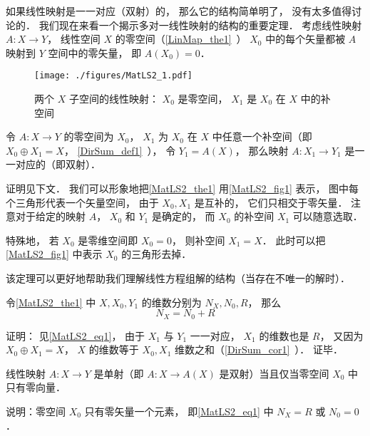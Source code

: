

如果线性映射是一一对应（双射）的， 那么它的结构简单明了， 没有太多值得讨论的． 我们现在来看一个揭示多对一线性映射的结构的重要定理． 考虑线性映射 $A:X\to Y$， 线性空间 $X$ 的零空间（\autoref{LinMap_the1}~） $X_0$ 中的每个矢量都被 $A$ 映射到 $Y$ 空间中的零矢量， 即 $A(X_0) = \qty{0}$．

\begin{figure}[ht]
\centering
\texttt{[image: ./figures/MatLS2\_1.pdf]}
\caption{两个 $X$ 子空间的线性映射： $X_0$ 是零空间， $X_1$ 是 $X_0$ 在 $X$ 中的补空间} \label{MatLS2_fig1}
\end{figure}

\begin{theorem}{}\label{MatLS2_the1}
令 $A:X \to Y$ 的零空间为 $X_0$， $X_1$ 为 $X_0$ 在 $X$ 中任意一个补空间（即 $X_0\oplus X_1 = X$， \autoref{DirSum_def1}~）， 令 $Y_1 = A(X)$， 那么映射 $A:X_1\to Y_1$ 是一一对应的（即双射）．
\end{theorem}
证明见下文． 我们可以形象地把\autoref{MatLS2_the1} 用\autoref{MatLS2_fig1} 表示， 图中每个三角形代表一个矢量空间， 由于 $X_0, X_1$ 是互补的， 它们只相交于零矢量． 注意对于给定的映射 $A$， $X_0$ 和 $Y_1$ 是确定的， 而 $X_0$ 的补空间 $X_1$ 可以随意选取．

特殊地， 若 $X_0$ 是零维空间即 $X_0 = \qty{0}$， 则补空间 $X_1 = X$． 此时可以把\autoref{MatLS2_fig1} 中表示 $X_0$ 的三角形去掉．

该定理可以更好地帮助我们理解线性方程组解的结构（当存在不唯一的解时）．

\begin{corollary}{}
令\autoref{MatLS2_the1} 中 $X, X_0, Y_1$ 的维数分别为 $N_X, N_0, R$， 那么
\begin{equation}\label{MatLS2_eq1}
N_X = N_0 + R
\end{equation}
\end{corollary}
证明： 见\autoref{MatLS2_eq1}， 由于 $X_1$ 与 $Y_1$ 一一对应， $X_1$ 的维数也是 $R$， 又因为 $X_0\oplus X_1 = X$， $X$ 的维数等于 $X_0, X_1$ 维数之和（\autoref{DirSum_cor1}~）． 证毕．

\begin{corollary}{}
线性映射 $A:X\to Y$ 是单射（即 $A:X\to A(X)$ 是双射）当且仅当零空间 $X_0$ 中只有零向量．
\end{corollary}
说明：零空间 $X_0$ 只有零矢量一个元素， 即\autoref{MatLS2_eq1} 中 $N_X = R$ 或 $N_0 = 0$．

